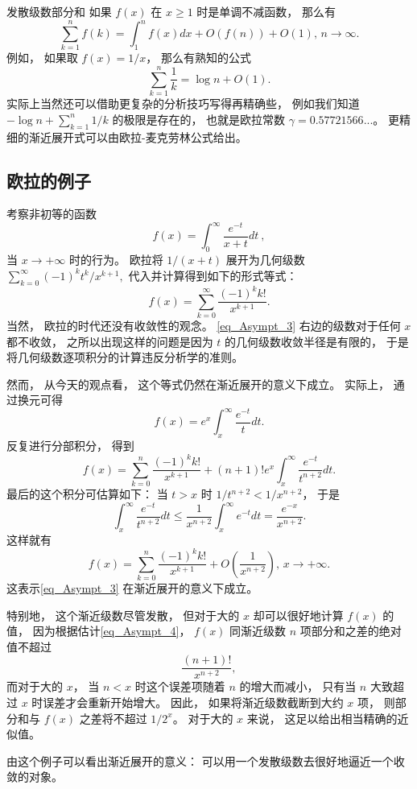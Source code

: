 \begin{example}{发散级数部分和}
如果 $f(x)$ 在 $x\geq1$ 时是单调不减函数， 那么有$$
\sum_{k=1}^nf(k)=\int_1^n f(x)dx+O(f(n))+O(1),\,n\to\infty.
$$
例如， 如果取 $f(x)=1/x$， 那么有熟知的公式
$$
\sum_{k=1}^n\frac{1}{k}=\log n+O(1).
$$
实际上当然还可以借助更复杂的分析技巧写得再精确些， 例如我们知道 $-\log n+\sum_{k=1}^n1/k$ 的极限是存在的， 也就是欧拉常数 $\gamma=0.57721566...$。 更精细的渐近展开式可以由欧拉-麦克劳林公式给出。
\end{example}

\subsection{欧拉的例子}
考察非初等的函数
$$
f(x)=\int_0^\infty\frac{e^{-t}}{x+t}dt~,
$$
当 $x\to+\infty$ 时的行为。 欧拉将 $1/(x+t)$ 展开为几何级数
$
\sum_{k=0}^\infty {(-1)^kt^k}/{x^{k+1}},
$
代入并计算得到如下的形式等式：
\begin{equation}\label{eq_Asympt_3}
f(x)=\sum_{k=0}^\infty\frac{(-1)^kk!}{x^{k+1}}.
\end{equation}
当然， 欧拉的时代还没有收敛性的观念。 \autoref{eq_Asympt_3} 右边的级数对于任何 $x$ 都不收敛， 之所以出现这样的问题是因为 $t$ 的几何级数收敛半径是有限的， 于是将几何级数逐项积分的计算违反分析学的准则。 

然而， 从今天的观点看， 这个等式仍然在渐近展开的意义下成立。 实际上， 通过换元可得
$$
f(x)=e^{x}\int_x^\infty \frac{e^{-t}}{t}dt.
$$
反复进行分部积分， 得到
$$
f(x)=\sum_{k=0}^n\frac{(-1)^kk!}{x^{k+1}}
+(n+1)!e^x\int_x^\infty\frac{e^{-t}}{t^{n+2}}dt.
$$
最后的这个积分可估算如下： 当 $t>x$ 时 $1/t^{n+2}<1/x^{n+2}$， 于是
\begin{equation}\label{eq_Asympt_4}
\int_x^\infty\frac{e^{-t}}{t^{n+2}}dt
\leq\frac{1}{x^{n+2}}\int_x^\infty e^{-t}dt
=\frac{e^{-x}}{x^{n+2}}.
\end{equation}
这样就有
$$
f(x)=\sum_{k=0}^n\frac{(-1)^kk!}{x^{k+1}}
+O\left(\frac{1}{x^{n+2}}\right),\,x\to+\infty.
$$
这表示\autoref{eq_Asympt_3} 在渐近展开的意义下成立。 

特别地， 这个渐近级数尽管发散， 但对于大的 $x$ 却可以很好地计算 $f(x)$ 的值， 因为根据估计\autoref{eq_Asympt_4}， $f(x)$ 同渐近级数 $n$ 项部分和之差的绝对值不超过
$$
\frac{(n+1)!}{x^{n+2}},
$$
而对于大的 $x$， 当 $n<x$ 时这个误差项随着 $n$ 的增大而减小， 只有当 $n$ 大致超过 $x$ 时误差才会重新开始增大。 因此， 如果将渐近级数截断到大约 $x$ 项， 则部分和与 $f(x)$ 之差将不超过 $1/2^x$。 对于大的 $x$ 来说， 这足以给出相当精确的近似值。 

由这个例子可以看出渐近展开的意义： 可以用一个发散级数去很好地逼近一个收敛的对象。